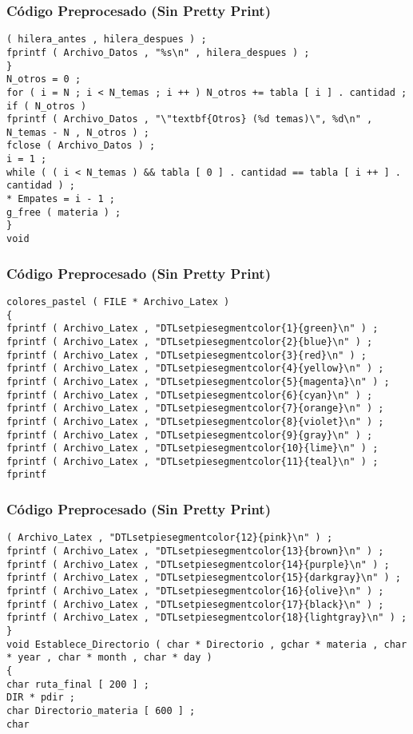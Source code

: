\documentclass{beamer}
\begin{document}
\begin{frame}[fragile]
\frametitle{C\'odigo Preprocesado (Sin Pretty Print)}
\begin{lstlisting}[style=CStyle]
( hilera_antes , hilera_despues ) ; 
fprintf ( Archivo_Datos , "%s\n" , hilera_despues ) ; 
} 
N_otros = 0 ; 
for ( i = N ; i < N_temas ; i ++ ) N_otros += tabla [ i ] . cantidad ; 
if ( N_otros ) 
fprintf ( Archivo_Datos , "\"textbf{Otros} (%d temas)\", %d\n" , N_temas - N , N_otros ) ; 
fclose ( Archivo_Datos ) ; 
i = 1 ; 
while ( ( i < N_temas ) && tabla [ 0 ] . cantidad == tabla [ i ++ ] . cantidad ) ; 
* Empates = i - 1 ; 
g_free ( materia ) ; 
} 
void \end{lstlisting}
\end{frame}
\begin{frame}[fragile]
\frametitle{C\'odigo Preprocesado (Sin Pretty Print)}
\begin{lstlisting}[style=CStyle]
colores_pastel ( FILE * Archivo_Latex ) 
{ 
fprintf ( Archivo_Latex , "DTLsetpiesegmentcolor{1}{green}\n" ) ; 
fprintf ( Archivo_Latex , "DTLsetpiesegmentcolor{2}{blue}\n" ) ; 
fprintf ( Archivo_Latex , "DTLsetpiesegmentcolor{3}{red}\n" ) ; 
fprintf ( Archivo_Latex , "DTLsetpiesegmentcolor{4}{yellow}\n" ) ; 
fprintf ( Archivo_Latex , "DTLsetpiesegmentcolor{5}{magenta}\n" ) ; 
fprintf ( Archivo_Latex , "DTLsetpiesegmentcolor{6}{cyan}\n" ) ; 
fprintf ( Archivo_Latex , "DTLsetpiesegmentcolor{7}{orange}\n" ) ; 
fprintf ( Archivo_Latex , "DTLsetpiesegmentcolor{8}{violet}\n" ) ; 
fprintf ( Archivo_Latex , "DTLsetpiesegmentcolor{9}{gray}\n" ) ; 
fprintf ( Archivo_Latex , "DTLsetpiesegmentcolor{10}{lime}\n" ) ; 
fprintf ( Archivo_Latex , "DTLsetpiesegmentcolor{11}{teal}\n" ) ; 
fprintf \end{lstlisting}
\end{frame}
\begin{frame}[fragile]
\frametitle{C\'odigo Preprocesado (Sin Pretty Print)}
\begin{lstlisting}[style=CStyle]
( Archivo_Latex , "DTLsetpiesegmentcolor{12}{pink}\n" ) ; 
fprintf ( Archivo_Latex , "DTLsetpiesegmentcolor{13}{brown}\n" ) ; 
fprintf ( Archivo_Latex , "DTLsetpiesegmentcolor{14}{purple}\n" ) ; 
fprintf ( Archivo_Latex , "DTLsetpiesegmentcolor{15}{darkgray}\n" ) ; 
fprintf ( Archivo_Latex , "DTLsetpiesegmentcolor{16}{olive}\n" ) ; 
fprintf ( Archivo_Latex , "DTLsetpiesegmentcolor{17}{black}\n" ) ; 
fprintf ( Archivo_Latex , "DTLsetpiesegmentcolor{18}{lightgray}\n" ) ; 
} 
void Establece_Directorio ( char * Directorio , gchar * materia , char * year , char * month , char * day ) 
{ 
char ruta_final [ 200 ] ; 
DIR * pdir ; 
char Directorio_materia [ 600 ] ; 
char \end{lstlisting}
\end{frame}
\end{document}
